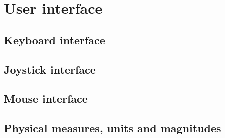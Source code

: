 \documentclass[Orbiter User Manual.tex]{subfiles}
\begin{document}
\section{User interface}

\subsection{Keyboard interface}

\subsection{Joystick interface}

\subsection{Mouse interface}

\subsection{Physical measures, units and magnitudes}
\end{document}
